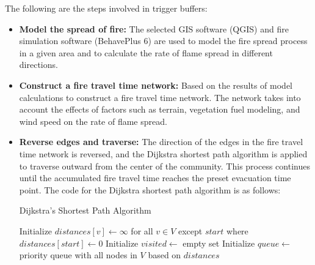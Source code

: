 \documentclass[12pt]{article}  %
\begin{document}
The following are the steps involved in trigger buffers:
\begin{itemize}
	\setlength{\parsep}{0ex} 
	\setlength{\topsep}{2ex} 
	\setlength{\itemsep}{1ex} 
	\item \textbf{Model the spread of fire:} The selected GIS software (QGIS) and fire simulation software (BehavePlus 6) are used to model the fire spread process in a given area and to calculate the rate of flame spread in different directions.
	
	\item \textbf{Construct a fire travel time network:} Based on the results of model calculations to construct a fire travel time network. The network takes into account the effects of factors such as terrain, vegetation fuel modeling, and wind speed on the rate of flame spread.
	
	\item \textbf{Reverse edges and traverse:} The direction of the edges in the fire travel time network is reversed, and the Dijkstra shortest path algorithm is applied to traverse outward from the center of the community. This process continues until the accumulated fire travel time reaches the preset evacuation time point. The code for the Dijkstra shortest path algorithm is as follows:

\noindent\hspace{-2.5em} %
\begin{algorithm}[H]
	\DontPrintSemicolon %
	\caption{Dijkstra's Shortest Path Algorithm}
	\BlankLine
	\SetAlgoLined %
	Initialize $distances[v] \gets \infty$ for all $v \in V$ except $start$ where $distances[start] \gets 0$\;
	Initialize $visited \gets$ empty set\;
	Initialize $queue \gets$ priority queue with all nodes in $V$ based on $distances$\;
\end{algorithm}
	
	
\end{itemize}
\end{document}
